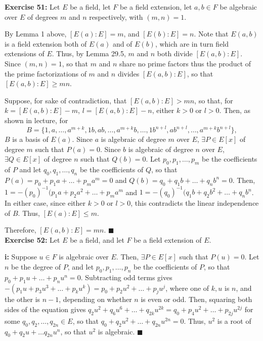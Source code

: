\documentclass{article}%
\begin{document}
\textbf{Exercise 51:} Let $E$ be a field, let $F$ be a field extension, let
$a,b \in F$ be algebraic over $E$ of degrees $m$ and $n$ respectively, with
$(m,n) = 1$.

By Lemma 1 above, $[E(a) : E] = m$, and $[E(b) : E] = n$. Note that $E(a,b)$
is a field extension both of $E(a)$ and of $E(b)$, which are in turn field
extensions of $E$. Thus, by Lemma 29.5, $m$ and $n$ both divide
$[E(a,b) : E]$. Since $(m,n) = 1$, so that $m$ and $n$ share no
prime factors thus the product of the prime factorizations of $m$ and $n$
divides $[E(a,b) : E]$, so that $[E(a,b) : E] \geq mn$.

Suppose, for sake of contradiction, that $[E(a,b) : E] > mn$, so that, for
$k = [E(a,b) : E] - m$, $l = [E(a,b) : E] - n$, either $k > 0$ or $l > 0$.
Then, as shown in lecture, for \[B = \{1, a, \ldots, a^{m + k}, 1b, ab,
\ldots, a^{m + k}b, \ldots, 1b^{n + l}, ab^{n + l}, \ldots,
a^{m + k}b^{n + l}\},\] $B$ is a basis of $E(a)$. Since $a$ is algebraic of
degree $m$ over $E$, $\exists P \in E[x]$
of degree $m$ such that $P(a) = 0$. Since $b$ is algebraic of degree $n$ over
$E$, $\exists Q \in E[x]$ of degree $n$ such that $Q(b) = 0$. Let
$p_0, p_1, \ldots, p_m$ be the coefficients of $P$ and let
$q_0, q_1, \ldots, q_n$ be the coefficients of $Q$, so that
$P(a) = p_0 + p_1a + \ldots + p_ma^m = 0$ and
$Q(b) = q_0 + q_1b + \ldots + q_nb^n = 0$. Then,
$1 = -(p_0)^{-1}(p_1a + p_2a^2 + \ldots + p_ma^m$ and
$1 = -(q_0)^{-1}(q_1b + q_2b^2 + \ldots + q_nb^n$. In either case, since
either $k > 0$ or $l > 0$, this contradicts the linear independence of $B$.
Thus, $[E(a) : E] \leq m$.

Therefore, $[E(a,b) : E] = mn$. \qquad $\blacksquare$ \\

\textbf{Exercise 52:} Let $E$ be a field, and let $F$ be a field extension of
$E$.

\textbf{i:} Suppose $u \in F$ is algebraic over $E$. Then, $\exists P \in
E[x]$ such that $P(u) = 0$. Let $n$ be the degree of $P$, and let $p_0, p_1,
\ldots, p_n$ be the coefficients of $P$, so that  $p_0 + p_1u + \ldots +
p_nu^n = 0$. Subtracting odd terms gives $-(p_1u + p_3u^3 + \ldots + p_ku^k)
 = p_0 + p_2u^2 + \ldots + p_ju^j$, where one of $k, u$ is $n$, and the other
is $n - 1$, depending on whether $n$ is even or odd. Then, squaring both sides
of the equation gives $q_2u^2 + q_6u^6 + \ldots + q_{2k}u^{2k}
= q_0 + p_4u^2 + \ldots + p_{2j}u^{2j}$ for some $q_0, q_2, \ldots, q_{2n}
\in E$, so that $q_0 + q_2u^2 + \ldots + q_{2n}u^{2n} = 0$. Thus, $u^2$ is a
root of $q_0 + q_2u + \ldots q_{2n}u^n$, so that $u^2$ is algebraic.
\qquad $\blacksquare$ \\
\end{document}
